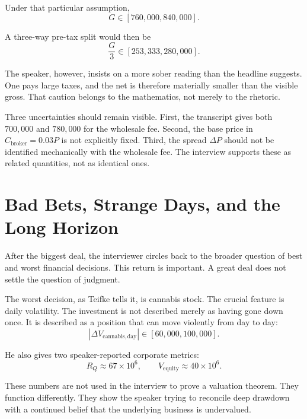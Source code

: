 Under that particular assumption,
\begin{equation}
G \in [760{,}000,840{,}000].
\end{equation}

A three-way pre-tax split would then be
\begin{equation}
\frac{G}{3} \in [253{,}333,280{,}000].
\end{equation}

The speaker, however, insists on a more sober reading than the headline suggests. One pays large taxes, and the net is therefore materially smaller than the visible gross. That caution belongs to the mathematics, not merely to the rhetoric.

\begin{remark}
Three uncertainties should remain visible. First, the transcript gives both \(700{,}000\) and \(780{,}000\) for the wholesale fee. Second, the base price in \(C_{\mathrm{broker}}=0.03P\) is not explicitly fixed. Third, the spread \(\Delta P\) should not be identified mechanically with the wholesale fee. The interview supports these as related quantities, not as identical ones.
\end{remark}

\section{Bad Bets, Strange Days, and the Long Horizon}

After the biggest deal, the interviewer circles back to the broader question of best and worst financial decisions. This return is important. A great deal does not settle the question of judgment.

The worst decision, as Teifke tells it, is cannabis stock. The crucial feature is daily volatility. The investment is not described merely as having gone down once. It is described as a position that can move violently from day to day:
\begin{equation}
|\Delta V_{\mathrm{cannabis,day}}| \in [60{,}000,100{,}000].
\end{equation}

He also gives two speaker-reported corporate metrics:
\begin{equation}
R_Q \approx 67\times 10^6,
\qquad
V_{\mathrm{equity}} \approx 40\times 10^6.
\end{equation}

These numbers are not used in the interview to prove a valuation theorem. They function differently. They show the speaker trying to reconcile deep drawdown with a continued belief that the underlying business is undervalued.

